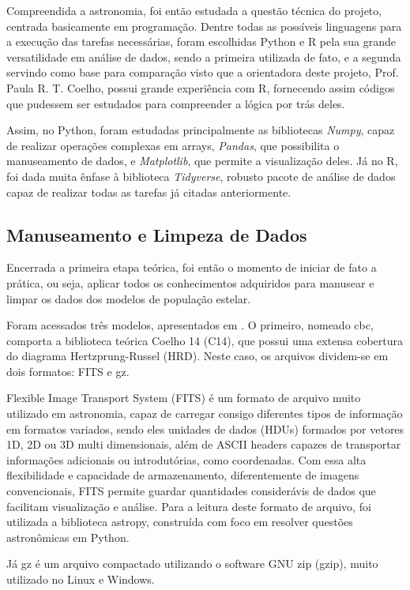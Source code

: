 \documentclass[12pt]{projeto}
\begin{document}
Compreendida a astronomia, foi então estudada a questão técnica do projeto, centrada basicamente em programação. Dentre todas as possíveis linguagens para a execução das tarefas necessárias, foram escolhidas Python e R pela sua grande versatilidade em análise de dados, sendo a primeira utilizada de fato, e a segunda servindo como base para comparação visto que a orientadora deste projeto, Prof. Paula R. T. Coelho, possui grande experiência com R, fornecendo assim códigos que pudessem ser estudados para compreender a lógica por trás deles.

Assim, no Python, foram estudadas principalmente as bibliotecas \textit{Numpy}, capaz de realizar operações complexas em arrays, \textit{Pandas}, que possibilita o manuseamento de dados, e \textit{Matplotlib}, que permite a visualização deles. Já no R, foi dada muita ênfase à biblioteca \textit{Tidyverse}, robusto pacote de análise de dados capaz de realizar todas as tarefas já citadas anteriormente.

\subsection{Manuseamento e Limpeza de Dados}

Encerrada a primeira etapa teórica, foi então o momento de iniciar de fato a prática, ou seja, aplicar todos os conhecimentos adquiridos para manusear e limpar os dados dos modelos de população estelar.

Foram acessados três modelos, apresentados em \cite{Paula2020}. O primeiro, nomeado cbc, comporta a biblioteca teórica Coelho 14 (C14), que possui uma extensa cobertura do diagrama Hertzprung-Russel (HRD). Neste caso, os arquivos dividem-se em dois formatos: FITS e gz. 

Flexible Image Transport System (FITS) é um formato de arquivo muito utilizado em astronomia, capaz de carregar consigo diferentes tipos de informação em formatos variados, sendo eles unidades de dados (HDUs) formados por vetores 1D, 2D ou 3D multi dimensionais, além de ASCII headers capazes de transportar informações adicionais ou introdutórias, como coordenadas. Com essa alta flexibilidade e capacidade de armazenamento, diferentemente de imagens convencionais, FITS permite guardar quantidades considerávis de dados que facilitam visualização e análise. Para a leitura deste formato de arquivo, foi utilizada a biblioteca astropy, construída com foco em resolver questões astronômicas em Python.

Já gz é um arquivo compactado utilizando o software GNU zip (gzip), muito utilizado no Linux e Windows.
\end{document}
